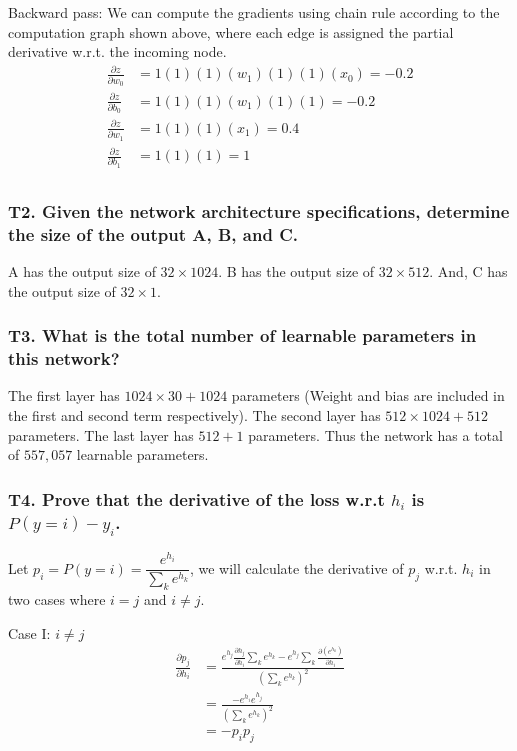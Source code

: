 \documentclass{article}
\begin{document}
Backward pass: We can compute the gradients using chain rule according to the computation graph shown above, where each edge is assigned the partial derivative w.r.t. the incoming node.
\begin{align*}
    \frac{\partial z}{\partial w_0} & =1(1)(1)(w_1)(1)(1)(x_0)=-0.2 \\
    \frac{\partial z}{\partial b_0} & =1(1)(1)(w_1)(1)(1)=-0.2      \\
    \frac{\partial z}{\partial w_1} & =1(1)(1)(x_1)=0.4             \\
    \frac{\partial z}{\partial b_1} & =1(1)(1)=1                    \\
\end{align*}

\subsubsection*{T2. Given the network architecture specifications, determine the size of the output A, B, and C.}
A has the output size of \(32 \times 1024\). B has the output size of \(32 \times 512\). And, C has the output size of \(32 \times 1\).

\subsubsection*{T3. What is the total number of learnable parameters in this network?}
The first layer has \(1024 \times 30 + 1024\) parameters (Weight and bias are included in the first and second term respectively). The second layer has \(512\times1024+512\) parameters. The last layer has \(512+1\) parameters.
Thus the network has a total of \(557,057\) learnable parameters.
\newpage
\subsubsection*{T4. Prove that the derivative of the loss w.r.t \(h_i\) is \(P(y=i)-y_i\).}
Let \(p_i=P(y=i)=\dfrac{e^{h_i}}{\sum_k e^{h_k}}\), we will calculate the derivative of \(p_j\) w.r.t. \(h_i\) in two cases where \(i=j\) and \(i\neq j\).

Case I: \(i\neq j\)
\begin{align*}
    \frac{\partial p_j}{\partial h_i} & =\frac{e^{h_j}\frac{\partial h_j}{\partial h_i} \sum_k e^{h_k}-e^{h_j}\sum_k{\frac{\partial (e^{h_k})}{\partial h_i}}}{\left( \sum_k e^{h_k} \right)^2} \\
                                      & =\frac{-e^{h_i}e^{h_j}}{\left( \sum_k e^{h_k} \right)^2}                                                                                                \\
                                      & =-p_i p_j
\end{align*}
\end{document}
